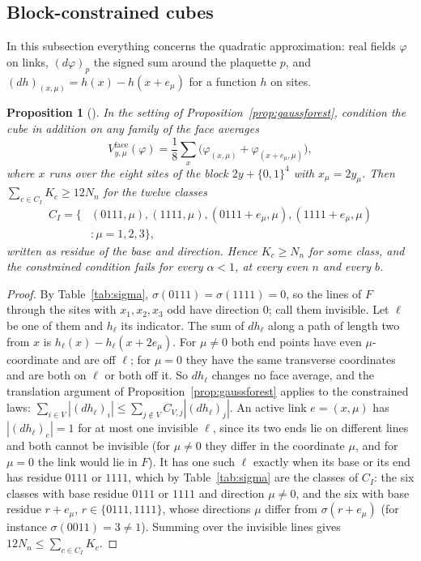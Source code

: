 \documentclass[11pt]{amsart}
\newtheorem{proposition}[theorem]{Proposition}
\theoremstyle{definition}
\theoremstyle{remark}
\numberwithin{equation}{section}
\begin{document}
\subsection{Block-constrained cubes}\label{ssec:constrained}

In this subsection everything concerns the quadratic approximation: real
fields $\varphi$ on links, $(d\varphi)_p$ the signed sum around the plaquette
$p$, and $(dh)_{(x,\mu)}=h(x)-h(x+e_\mu)$ for a function $h$ on sites.

\begin{proposition}[\cite{Loc26}]\label{prop:invisible}
In the setting of Proposition~\ref{prop:gaussforest}, condition the cube in
addition on any family of the face averages
\[
V^{\mathrm{face}}_{y,\mu}(\varphi)=\frac18\sum_{x}\bigl(\varphi_{(x,\mu)}
+\varphi_{(x+e_\mu,\mu)}\bigr),
\]
where $x$ runs over the eight sites of the block $2y+\{0,1\}^4$ with
$x_\mu=2y_\mu$. Then $\sum_{c\in C_I}K_c\ge12N_n$ for the twelve classes
\[
\begin{split}
C_I=\{&(0111,\mu),(1111,\mu),(0111+e_\mu,\mu),(1111+e_\mu,\mu)\\
&:\mu=1,2,3\},
\end{split}
\]
written as residue of the base and direction. Hence $K_c\ge N_n$ for some
class, and the constrained condition fails for every $\alpha<1$, at every
even $n$ and every $b$.
\end{proposition}

\begin{proof}
By Table~\ref{tab:sigma}, $\sigma(0111)=\sigma(1111)=0$, so the lines of $F$
through the sites with $x_1,x_2,x_3$ odd have direction $0$; call them
invisible. Let $\ell$ be one of them and $h_\ell$ its indicator. The sum of
$dh_\ell$ along a path of length two from $x$ is $h_\ell(x)-h_\ell(x+2e_\mu)$.
For $\mu\ne0$ both end points have even $\mu$-coordinate and are off $\ell$;
for $\mu=0$ they have the same transverse coordinates and are both on $\ell$
or both off it. So $dh_\ell$ changes no face average, and the translation
argument of Proposition~\ref{prop:gaussforest} applies to the constrained
laws: $\sum_{i\in V}|(dh_\ell)_i|\le\sum_{j\notin V}C_{V,j}|(dh_\ell)_j|$. An
active link $e=(x,\mu)$ has $|(dh_\ell)_e|=1$ for at most one invisible
$\ell$, since its two ends lie on different lines and both cannot be
invisible (for $\mu\ne0$ they differ in the coordinate $\mu$, and for $\mu=0$
the link would lie in $F$). It has one such $\ell$ exactly when its base or
its end has residue $0111$ or $1111$, which by Table~\ref{tab:sigma} are the
classes of $C_I$: the six classes with base residue $0111$ or $1111$ and
direction $\mu\ne0$, and the six with base residue $r+e_\mu$, $r\in\{0111,
1111\}$, whose directions $\mu$ differ from $\sigma(r+e_\mu)$ (for instance
$\sigma(0011)=3\ne1$). Summing over the invisible lines gives $12N_n\le
\sum_{c\in C_I}K_c$.
\end{proof}
\end{document}

